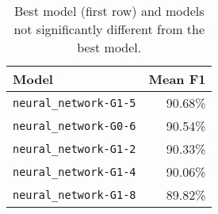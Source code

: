 \begin{table}[H]
\centering
\capstart
\begin{tabularx}{0.48\textwidth}{|X|r|}
\hline
Model & Mean F1 \\
\hline
\texttt{neural\_network-G1-5} & 90.68\% \\
\texttt{neural\_network-G0-6} & 90.54\% \\
\texttt{neural\_network-G1-2} & 90.33\% \\
\texttt{neural\_network-G1-4} & 90.06\% \\
\texttt{neural\_network-G1-8} & 89.82\% \\
\hline
\end{tabularx}
\caption{Best model (first row) and models not significantly different from the best model.}
\label{tab:best_models}

\end{table}
